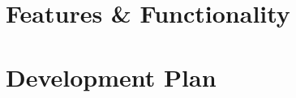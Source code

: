 \documentclass[12pt]{article}
\begin{document}
\section{Features \& Functionality}

\section{Development Plan}
\end{document}
